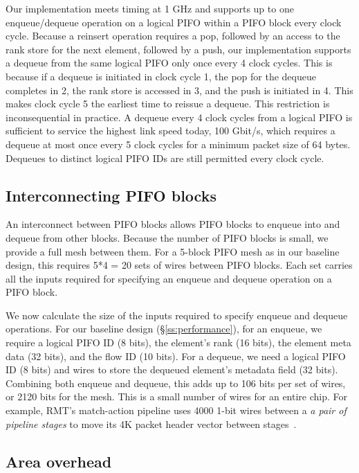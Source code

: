 Our implementation meets timing at 1 GHz and supports up to one enqueue/dequeue
operation on a logical PIFO within a PIFO block every clock cycle. Because a reinsert
operation requires a pop, followed by an access to the rank store for the next
element, followed by a push, our implementation supports a dequeue from the
same logical PIFO only once every 4 clock cycles. This is because if a dequeue is
initiated in clock cycle 1, the pop for the dequeue completes in 2, the rank
store is accessed in 3, and the push is initiated in 4. This makes clock cycle 5 the
earliest time to reissue a dequeue.  This restriction is inconsequential in
practice.  A dequeue every 4 clock cycles from a logical PIFO is sufficient to
service the highest link speed today, 100 Gbit/s, which requires a dequeue at
most once every 5 clock cycles for a minimum packet size of 64 bytes. Dequeues
to distinct logical PIFO IDs are still permitted every clock cycle.

\subsection{Interconnecting PIFO blocks}
\label{ss:interconnect}

An interconnect between PIFO blocks allows PIFO blocks to enqueue into and
dequeue from other blocks. Because the number of PIFO blocks is small, we
provide a full mesh between them. For a 5-block PIFO mesh as in our baseline
design, this requires 5*4 = 20 sets of wires between PIFO blocks. Each set
carries all the inputs required for specifying an enqueue and dequeue operation
on a PIFO block.

We now calculate the size of the inputs required to specify enqueue and dequeue
operations.  For our baseline design (\S\ref{ss:performance}), for an enqueue,
we require a logical PIFO ID (8 bits), the element's rank (16 bits), the
element meta data (32 bits), and the flow ID (10 bits). For a dequeue, we need
a logical PIFO ID (8 bits) and wires to store the dequeued element's metadata
field (32 bits).  Combining both enqueue and dequeue, this adds up to 106 bits
per set of wires, or 2120 bits for the mesh. This is a small number of wires
for an entire chip.  For example, RMT's match-action pipeline uses 4000 1-bit
wires between a {\em a pair of pipeline stages} to move its 4K packet header
vector between stages~\cite{rmt}. 

\subsection{Area overhead}
\label{ss:feasibility}

